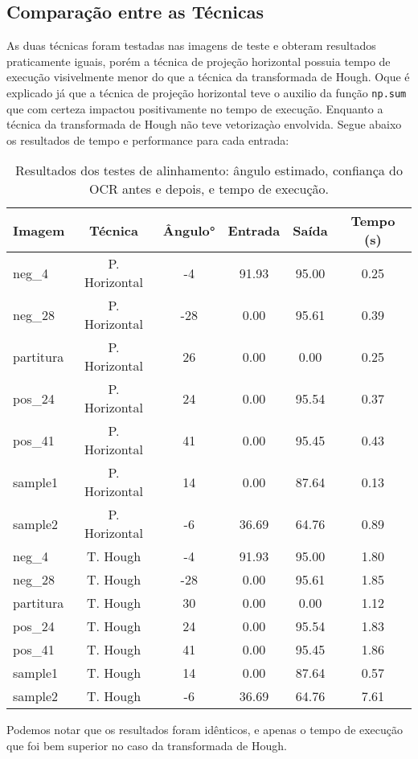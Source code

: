 \documentclass{article}
\begin{document}
\subsection{Comparação entre as Técnicas}
As duas técnicas foram testadas nas imagens de teste e obteram resultados praticamente iguais, porém a técnica de projeção horizontal possuia tempo de execução visivelmente menor do que a técnica da transformada de Hough. Oque é explicado já que a técnica de projeção horizontal teve o auxilio da função \texttt{np.sum} que com certeza impactou positivamente no tempo de execução. Enquanto a técnica da transformada de Hough não teve vetorizaçào envolvida. Segue abaixo os resultados de tempo e performance para cada entrada:
\begin{table}[H]
\centering
\begin{tabular}{|l|c|c|c|c|c|}
\hline
\textbf{Imagem} & \textbf{Técnica} & \textbf{Ângulo°} & \textbf{Entrada} & \textbf{Saída} & \textbf{Tempo (s)} \\
\hline
neg\_4      & P. Horizontal & -4   & 91.93 & 95.00 & 0.25 \\
neg\_28     & P. Horizontal & -28  & 0.00  & 95.61 & 0.39 \\
partitura   & P. Horizontal & 26   & 0.00  & 0.00  & 0.25 \\
pos\_24     & P. Horizontal & 24   & 0.00  & 95.54 & 0.37 \\
pos\_41     & P. Horizontal & 41   & 0.00  & 95.45 & 0.43 \\
sample1     & P. Horizontal & 14   & 0.00  & 87.64 & 0.13 \\
sample2     & P. Horizontal & -6   & 36.69 & 64.76 & 0.89 \\
\hline
neg\_4      & T. Hough  & -4   & 91.93 & 95.00 & 1.80 \\
neg\_28     & T. Hough  & -28  & 0.00  & 95.61 & 1.85 \\
partitura   & T. Hough  & 30   & 0.00  & 0.00  & 1.12 \\
pos\_24     & T. Hough  & 24   & 0.00  & 95.54 & 1.83 \\
pos\_41     & T. Hough  & 41   & 0.00  & 95.45 & 1.86 \\
sample1     & T. Hough  & 14   & 0.00  & 87.64 & 0.57 \\
sample2     & T. Hough  & -6   & 36.69 & 64.76 & 7.61 \\
\hline
\end{tabular}
\caption{Resultados dos testes de alinhamento: ângulo estimado, confiança do OCR antes e depois, e tempo de execução.}
\label{tab:resultados}
\end{table}
Podemos notar que os resultados foram idênticos, e apenas o tempo de execução que foi bem superior no caso da transformada de Hough.
\end{document}
